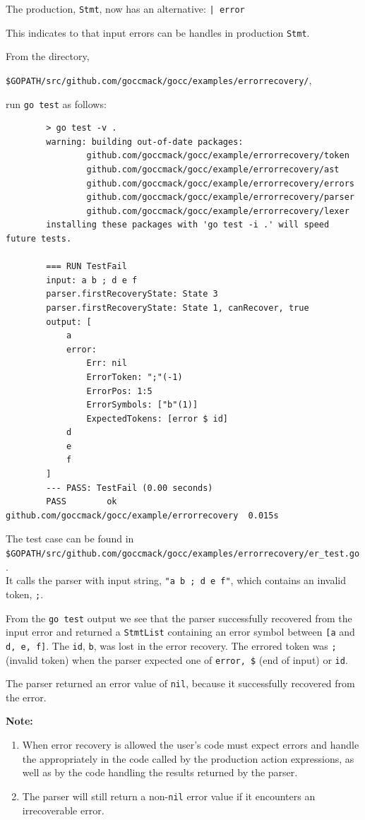 \documentclass[12pt]{article}
\begin{document}
	The production, \verb|Stmt|, now has an alternative: \verb"| error"

	This indicates to \gocc that input errors can be handles in production \verb|Stmt|.

	From the directory,

	\verb|$GOPATH/src/github.com/goccmack/gocc/examples/errorrecovery/|,

	run \verb|go test| as follows:

	\begin{verbatim}
		> go test -v .
		warning: building out-of-date packages:
		        github.com/goccmack/gocc/example/errorrecovery/token
		        github.com/goccmack/gocc/example/errorrecovery/ast
		        github.com/goccmack/gocc/example/errorrecovery/errors
		        github.com/goccmack/gocc/example/errorrecovery/parser
		        github.com/goccmack/gocc/example/errorrecovery/lexer
		installing these packages with 'go test -i .' will speed future tests.

		=== RUN TestFail
		input: a b ; d e f
		parser.firstRecoveryState: State 3
		parser.firstRecoveryState: State 1, canRecover, true
		output: [
		    a
		    error:
		        Err: nil
		        ErrorToken: ";"(-1)
		        ErrorPos: 1:5
		        ErrorSymbols: ["b"(1)]
		        ExpectedTokens: [error $ id]
		    d
		    e
		    f
		]
		--- PASS: TestFail (0.00 seconds)
		PASS		ok      github.com/goccmack/gocc/example/errorrecovery	0.015s
	\end{verbatim}

	The test case can be found in \\
	\verb|$GOPATH/src/github.com/goccmack/gocc/examples/errorrecovery/er_test.go|. \\
	It calls the parser with input string, \verb|"a b ; d e f"|, which contains an invalid token, \verb|;|.

	From the \verb|go test| output we see that the parser successfully recovered from the input error and returned a \verb|StmtList| containing an error symbol between \verb|[a| and \verb|d, e, f]|. The \verb|id|, \verb|b|, was lost in the error recovery.  The errored token was \verb|;| (invalid token) when the parser expected one of \verb|error, $| (end of input) or \verb|id|.

	The parser returned an error value of \verb|nil|, because it successfully recovered from the error.

	{\bf Note:} \\
	\begin{enumerate}
		\item When error recovery is allowed the user's code must expect errors and handle the appropriately in the code called by the production action expressions, as well as by the code handling the results returned by the parser.

		\item The parser will still return a non-\verb|nil| error value if it encounters an irrecoverable error.
	\end{enumerate}
\end{document}

